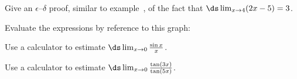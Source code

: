 \begin{exercises}
\begin{exercise} Give an $\epsilon$--$\delta$ proof, similar to
example~,
of the fact that 
$\ds \lim_{x\to 4} (2x-5) = 3$. 
\end{exercise}

\begin{exercise} Evaluate the expressions by reference to this graph:\hfill\break


\end{exercise}

\begin{exercise} Use a calculator to estimate $\ds\lim_{x\to 0}
{\sin x\over x}$.
\end{exercise}

\begin{exercise} Use a calculator to estimate $\ds\lim_{x\to 0}
{\tan(3x)\over\tan(5x)}$.
\end{exercise}

\end{exercises}
